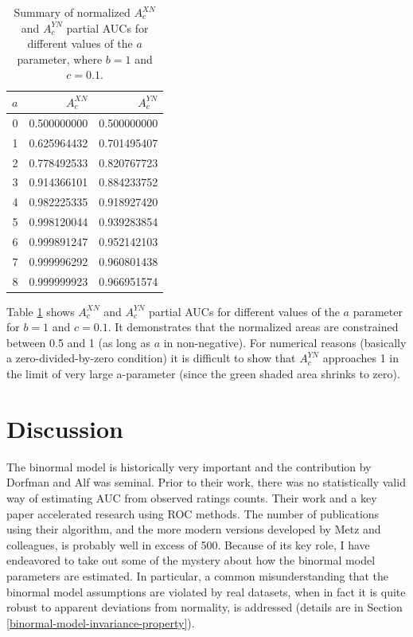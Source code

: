 \documentclass[
]{book}
\begin{document}
\begin{table}

\caption{\label{tab:summary-table-partial-normalized-areas}Summary of normalized $A_c^{XN}$ and $A_c^{YN}$ partial AUCs for different values of the $a$ parameter, where $b = 1$ and $c = 0.1$.}
\centering
\begin{tabular}[t]{r|r|r}
\hline
$a$ & $A^{XN}_c$ & $A^{YN}_c$\\
\hline
0 & 0.500000000 & 0.500000000\\
\hline
1 & 0.625964432 & 0.701495407\\
\hline
2 & 0.778492533 & 0.820767723\\
\hline
3 & 0.914366101 & 0.884233752\\
\hline
4 & 0.982225335 & 0.918927420\\
\hline
5 & 0.998120044 & 0.939283854\\
\hline
6 & 0.999891247 & 0.952142103\\
\hline
7 & 0.999996292 & 0.960801438\\
\hline
8 & 0.999999923 & 0.966951574\\
\hline
\end{tabular}
\end{table}

Table \ref{tab:summary-table-partial-normalized-areas} shows \(A_c^{XN}\) and \(A_c^{YN}\) partial AUCs for different values of the \(a\) parameter for \(b = 1\) and \(c = 0.1\). It demonstrates that the normalized areas are constrained between 0.5 and 1 (as long as \(a\) in non-negative). For numerical reasons (basically a zero-divided-by-zero condition) it is difficult to show that \(A_c^{YN}\) approaches 1 in the limit of very large a-parameter (since the green shaded area shrinks to zero).

\hypertarget{binormal-model-discussion}{%
\section{Discussion}\label{binormal-model-discussion}}

The binormal model is historically very important and the contribution by Dorfman and Alf \citep{RN1081} was seminal. Prior to their work, there was no statistically valid way of estimating AUC from observed ratings counts. Their work and a key paper \citep{RN1487} accelerated research using ROC methods. The number of publications using their algorithm, and the more modern versions developed by Metz and colleagues, is probably well in excess of 500. Because of its key role, I have endeavored to take out some of the mystery about how the binormal model parameters are estimated. In particular, a common misunderstanding that the binormal model assumptions are violated by real datasets, when in fact it is quite robust to apparent deviations from normality, is addressed (details are in Section \ref{binormal-model-invariance-property}).
\end{document}
